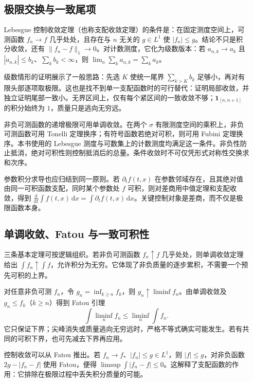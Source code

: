 \documentclass[12pt,fontset=fandol]{ctexart}
\begin{document}
\subsection{极限交换与一致尾项}

\label{app:integration-exchange}

Lebesgue 控制收敛定理（也称支配收敛定理）的条件是：在固定测度空间上，可测函数 $f_n\to f$ 几乎处处，且存在与 $n$ 无关的 $g\in L^1$ 使 $|f_n|\leq g$。结论不只是积分收敛，还有 $\|f_n-f\|_1\to0$。对计数测度，它化为级数版本：若 $a_{n,k}\to a_k$ 且 $|a_{n,k}|\leq b_k$、$\sum_kb_k<\infty$，则 $\lim_n\sum_ka_{n,k}=\sum_ka_k$。

级数情形的证明展示了一般思路：先选 $K$ 使统一尾界 $\sum_{k>K}b_k$ 足够小，再对有限头部逐项取极限。这也是找不到单一支配函数时的可行替代：证明局部收敛，并独立证明尾部一致小。无界区间上，仅有每个紧区间的一致收敛不够；$\mathbf1_{[n,n+1]}$ 的积分始终为 $1$，质量只是逃向无穷远。

非负可测函数的递增极限可用单调收敛。在两个 $\sigma$ 有限测度空间的乘积上，非负可测函数可用 Tonelli 定理换序；有符号函数若绝对可积，则可用 Fubini 定理换序。本书使用的 Lebesgue 测度与可数集上的计数测度均满足这一条件。非负性防止抵消，绝对可积性则控制抵消后的总量。条件收敛时不可仅凭形式对称性交换求和次序。

参数积分求导也应归结到同一原则。若 $\partial_tf(t,x)$ 在参数邻域存在，且其绝对值由同一可积函数支配，同时某个参数处 $f$ 可积，则对差商用中值定理和支配收敛，得到 $\frac{\mathrm d}{\mathrm dt}\int f(t,x)\,\mathrm dx=\int\partial_tf(t,x)\,\mathrm dx$。关键控制对象是差商，而不仅是极限函数本身。

\subsection{单调收敛、Fatou 与一致可积性}

\label{app:integration-fatou}

三条基本定理可按逻辑组织。若非负可测函数 $f_n\uparrow f$ 几乎处处，则单调收敛定理给出 $\int f_n\uparrow\int f$，允许积分为无穷。它体现了非负质量的逐步累积，不需要一个预先可积的上界。

对任意非负可测 $f_n$，令 $g_n=\inf_{k\geq n}f_k$，则 $g_n\uparrow\liminf f_n$。由单调收敛及 $g_n\leq f_k$（$k\geq n$）得到 Fatou 引理
\[
\int\liminf_nf_n\leq\liminf_n\int f_n.
\]
它只保证下界；尖峰消失或质量逃向无穷远时，严格不等式确实可能发生。若有共同的可积下界，也可先减去下界再应用。

控制收敛可以从 Fatou 推出。若 $f_n\to f$、$|f_n|\leq g\in L^1$，则 $|f|\leq g$，对非负函数 $2g-|f_n-f|$ 使用 Fatou，便得 $\limsup\int|f_n-f|\leq0$。这解释了支配函数的作用：它排除在极限过程中丢失积分质量的可能。
\end{document}
